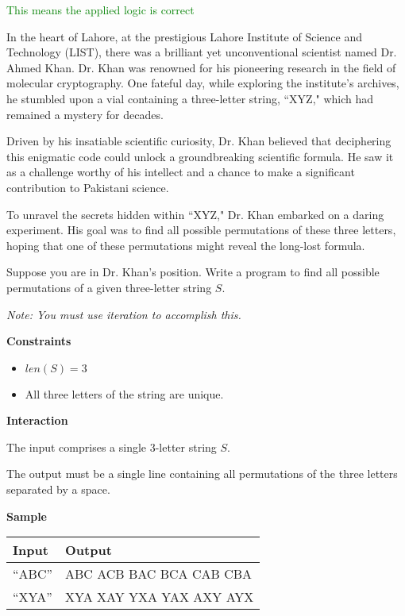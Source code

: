 \documentclass[a4paper]{exam}
\newcommand\alert[2]{\centerline{\textbf\large{\underline{\color{#1}{#2}}}}}
\newcommand\heading[1]{\textbf{#1}}
\begin{document}
\begin{questions}
\textcolor{green}{This means the applied logic is correct}



  In the heart of Lahore, at the prestigious Lahore Institute of Science and Technology (LIST), there was a brilliant yet unconventional scientist named Dr. Ahmed Khan. Dr. Khan was renowned for his pioneering research in the field of molecular cryptography. One fateful day, while exploring the institute's archives, he stumbled upon a vial containing a three-letter string, ``XYZ," which had remained a mystery for decades.

Driven by his insatiable scientific curiosity, Dr. Khan believed that deciphering this enigmatic code could unlock a groundbreaking scientific formula. He saw it as a challenge worthy of his intellect and a chance to make a significant contribution to Pakistani science.

To unravel the secrets hidden within ``XYZ," Dr. Khan embarked on a daring experiment. His goal was to find all possible permutations of these three letters, hoping that one of these permutations might reveal the long-lost formula.

  Suppose you are in Dr. Khan's position. Write a program to find all possible permutations of a given three-letter string $S$.

  \emph{Note: You must use iteration to accomplish this.}

  \heading{Constraints}
  \begin{itemize}
    \item $len(S) = 3$
    \item All three letters of the string are unique.
  \end{itemize}

  \heading{Interaction}

  The input comprises a single 3-letter string $S$.

  The output must be a single line containing all permutations of the three letters separated by a space.

  \heading{Sample}

  \begin{tabularx}{\textwidth}{|X|X|}
    \rowcolor{gray!50}
    \hline
    Input & Output \\ \hline\hline
    ``ABC''  & ABC ACB BAC BCA CAB CBA \\\hline
    ``XYA''  & XYA XAY YXA YAX AXY AYX \\\hline
  \end{tabularx}


\end{questions}
\end{document}
